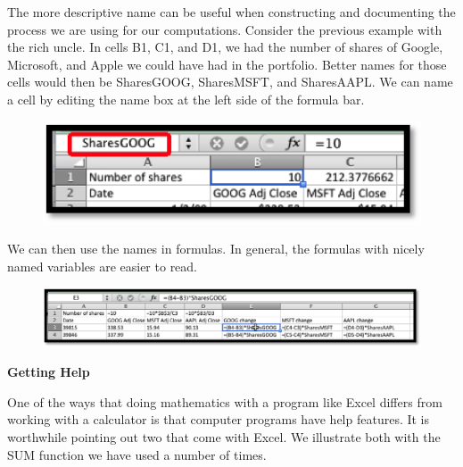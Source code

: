 \documentclass[10pt,]{book}
\newcommand{\terminology}[1]{\textbf{#1}}
\theoremstyle{plain}
\theoremstyle{definition}
\theoremstyle{definition}
\begin{document}
The more descriptive name can be useful when constructing and documenting the process we are using for our computations.  Consider the previous example with the rich uncle.  In cells B1, C1, and D1, we had the number of shares of Google, Microsoft, and Apple we could have had in the portfolio.  Better names for those cells would then be SharesGOOG, SharesMSFT, and SharesAAPL.  We can name a cell by editing the name box at the left side of the formula bar.%
\leavevmode%
\begin{figure}
\centering
\includegraphics[width=0.4\linewidth]{images/sec1-3-14.png}
\end{figure}
\par
We can then use the names in formulas.  In general, the formulas with nicely named variables are easier to read.
%
\leavevmode%
\begin{figure}
\centering
\includegraphics[width=0.8\linewidth]{images/sec1-3-15.png}
\end{figure}
\par
\terminology{
Getting Help
}%
\par
One of the ways that doing mathematics with a program like Excel differs from working with a calculator is that computer programs have help features.  It is worthwhile pointing out two that come with Excel.  We illustrate both with the SUM function we have used a number of times.%
\par
\end{document}
